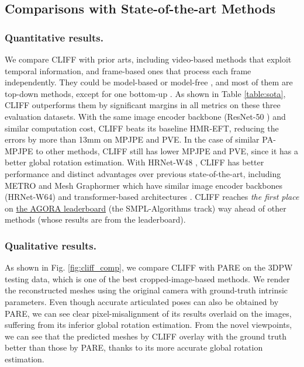 \documentclass[runningheads]{llncs}
\begin{document}
\subsection{Comparisons with State-of-the-art Methods}

\subsubsection{Quantitative results.}
We compare CLIFF with prior arts, including video-based methods \cite{kanazawa2019learning,choi2021beyond,kocabas2020vibe,wan2021encoder} that exploit temporal information, and frame-based ones \cite{choi2020pose2mesh,li2021hybrik,lin2021mesh,kolotouros2019learning} that process each frame independently.
They could be model-based \cite{kanazawa2018end,kocabas2021pare} or model-free \cite{moon2020i2l,lin2021end}, and most of them are top-down methods, except for one bottom-up \cite{sun2021monocular}.
As shown in Table \ref{table:sota}, CLIFF outperforms them by significant margins in all metrics on these three evaluation datasets.
With the same image encoder backbone (ResNet-50 \cite{he2016identity}) and similar computation cost, CLIFF beats its baseline HMR-EFT, reducing the errors by more than 13mm on MPJPE and PVE.
In the case of similar PA-MPJPE to other methods, CLIFF still has lower MPJPE and PVE, since it has a better global rotation estimation.
With HRNet-W48 \cite{sun2019deep}, CLIFF has better performance and distinct advantages over previous state-of-the-art, including METRO \cite{lin2021end} and Mesh Graphormer \cite{lin2021mesh} which have similar image encoder backbones (HRNet-W64) and transformer-based architectures \cite{vaswani2017attention}.
CLIFF reaches \textit{the first place} on \href{https://agora-evaluation.is.tuebingen.mpg.de}{the AGORA leaderboard} (the SMPL-Algorithms track) way ahead of other methods (whose results are from the leaderboard).



\subsubsection{Qualitative results.}
As shown in Fig. \ref{fig:cliff_comp}, we compare CLIFF with PARE \cite{kocabas2021pare} on the 3DPW testing data, which is one of the best cropped-image-based methods.
We render the reconstructed meshes using the original camera with ground-truth intrinsic parameters.
Even though accurate articulated poses can also be obtained by PARE, we can see clear pixel-misalignment of its results overlaid on the images, suffering from its inferior global rotation estimation.
From the novel viewpoints, we can see that the predicted meshes by CLIFF overlay with the ground truth better than those by PARE, thanks to its more accurate global rotation estimation.
\end{document}
